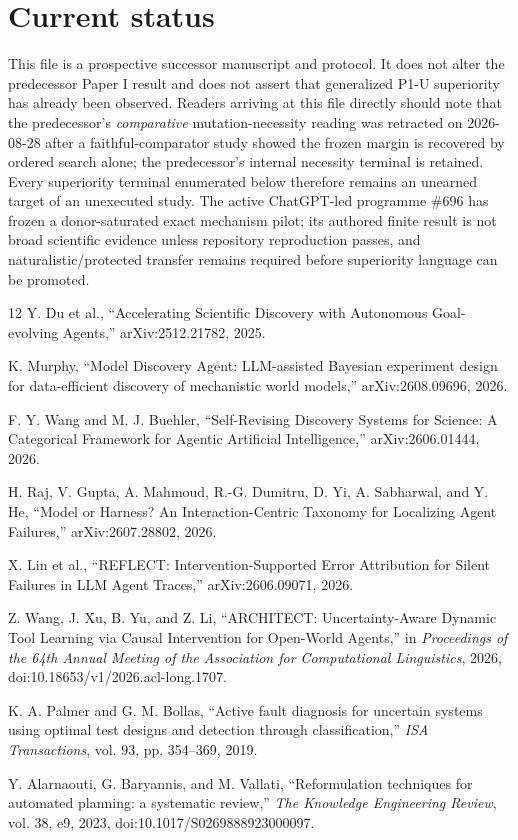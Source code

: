 \documentclass[11pt]{article}
\begin{document}
\section{Current status}
This file is a prospective successor manuscript and protocol. It does not alter the predecessor Paper I result and does not assert that generalized P1-U superiority has already been observed. Readers arriving at this file directly should note that the predecessor's \emph{comparative} mutation-necessity reading was retracted on 2026-08-28 after a faithful-comparator study showed the frozen margin is recovered by ordered search alone; the predecessor's internal necessity terminal is retained. Every superiority terminal enumerated below therefore remains an unearned target of an unexecuted study. The active ChatGPT-led programme \#696 has frozen a donor-saturated exact mechanism pilot; its authored finite result is not broad scientific evidence unless repository reproduction passes, and naturalistic/protected transfer remains required before superiority language can be promoted.

\begin{thebibliography}{12}
Y. Du et al., ``Accelerating Scientific Discovery with Autonomous Goal-evolving Agents,'' arXiv:2512.21782, 2025.

K. Murphy, ``Model Discovery Agent: LLM-assisted Bayesian experiment design for data-efficient discovery of mechanistic world models,'' arXiv:2608.09696, 2026.

F. Y. Wang and M. J. Buehler, ``Self-Revising Discovery Systems for Science: A Categorical Framework for Agentic Artificial Intelligence,'' arXiv:2606.01444, 2026.

H. Raj, V. Gupta, A. Mahmoud, R.-G. Dumitru, D. Yi, A. Sabharwal, and Y. He, ``Model or Harness? An Interaction-Centric Taxonomy for Localizing Agent Failures,'' arXiv:2607.28802, 2026.

X. Lin et al., ``REFLECT: Intervention-Supported Error Attribution for Silent Failures in LLM Agent Traces,'' arXiv:2606.09071, 2026.

Z. Wang, J. Xu, B. Yu, and Z. Li, ``ARCHITECT: Uncertainty-Aware Dynamic Tool Learning via Causal Intervention for Open-World Agents,'' in \emph{Proceedings of the 64th Annual Meeting of the Association for Computational Linguistics}, 2026, doi:10.18653/v1/2026.acl-long.1707.

K. A. Palmer and G. M. Bollas, ``Active fault diagnosis for uncertain systems using optimal test designs and detection through classification,'' \emph{ISA Transactions}, vol. 93, pp. 354--369, 2019.

Y. Alarnaouti, G. Baryannis, and M. Vallati, ``Reformulation techniques for automated planning: a systematic review,'' \emph{The Knowledge Engineering Review}, vol. 38, e9, 2023, doi:10.1017/S0269888923000097.
\end{thebibliography}
\end{document}
